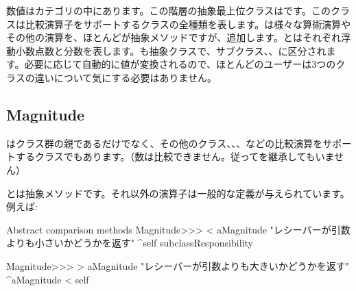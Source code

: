 \documentclass[a4paper,10pt,twoside]{book}
\begin{document}
数値はカテゴリの中にあります。この階層の抽象最上位クラスはです。このクラスは比較演算子をサポートするクラスの全種類を表します。は様々な算術演算やその他の演算を、ほとんどが抽象メソッドですが、追加します。とはそれぞれ浮動小数点数と分数を表します。も抽象クラスで、サブクラス、、に区分されます。必要に応じて自動的に値が変換されるので、ほとんどのユーザーは3つのクラスの違いについて気にする必要はありません。

\subsection{Magnitude}

はクラス群の親であるだけでなく、その他のクラス、、、などの比較演算をサポートするクラスでもあります。（数は比較できません。従ってを継承してもいません）

とは抽象メソッドです。それ以外の演算子は一般的な定義が与えられています。例えば:

\begin{method}{Abstract comparison methods}
Magnitude>>> < aMagnitude 
    "レシーバーが引数よりも小さいかどうかを返す"
    ^self subclassResponsibility

Magnitude>>> > aMagnitude 
    "レシーバーが引数よりも大きいかどうかを返す"
    ^aMagnitude < self
\end{method}
\end{document}
